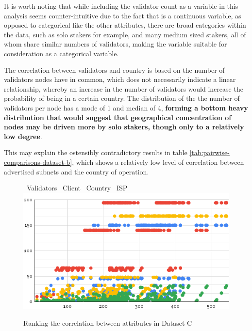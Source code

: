 \documentclass[conference]{IEEEtran}
\begin{document}
It is worth noting that while including the validator count as a variable in this analysis seems counter-intuitive due to the fact that is a continuous variable, as opposed to categorical like the other attributes, there are broad categories within the data, such as solo stakers for example, and many medium sized stakers, all of whom share similar numbers of validators, making the variable suitable for consideration as a categorical variable.

The correlation between validators and country is based on the number of validators nodes have in common, which does not necessarily indicate a linear relationship, whereby an increase in the number of validators would increase the probability of being in a certain country.  The distribution of the the number of validators per node has a mode of 1 and median of 4, \textbf{forming a bottom heavy distribution that would suggest that geographical concentration of nodes may be driven more by solo stakers, though only to a relatively low degree}.

This may explain the ostensibly contradictory results in table \ref{tab:pairwise-comparisons-dataset-b}, which shows a relatively low level of correlation between advertised subnets and the country of operation.

\begin{figure}[hbp]
    \centering
    \LARGE \textcolor{bluebullet}\textbullet\ \normalsize Validators %
    \LARGE \textcolor{redbullet}\textbullet\ \normalsize Client %
    \LARGE \textcolor{yellowbullet}\textbullet\ \normalsize Country %
    \LARGE \textcolor{greenbullet}\textbullet\ \normalsize ISP
    \includegraphics[width=1\linewidth]{figures/chart-3.png}
    \caption{Ranking the correlation between attributes in Dataset C}
    \label{fig:attribute-correlation-ranking-dataset-c}
\end{figure}
\end{document}
